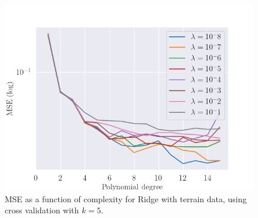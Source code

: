 %
\begin{figure}[H]
    \centering
    \includegraphics[width=\linewidth]{images/cv_ridge_terrain.png}
    \caption{MSE as a function of complexity for Ridge with terrain data, using cross validation with $k=5$.}
    \label{fig:cv_ridge_terrain}
\end{figure}

